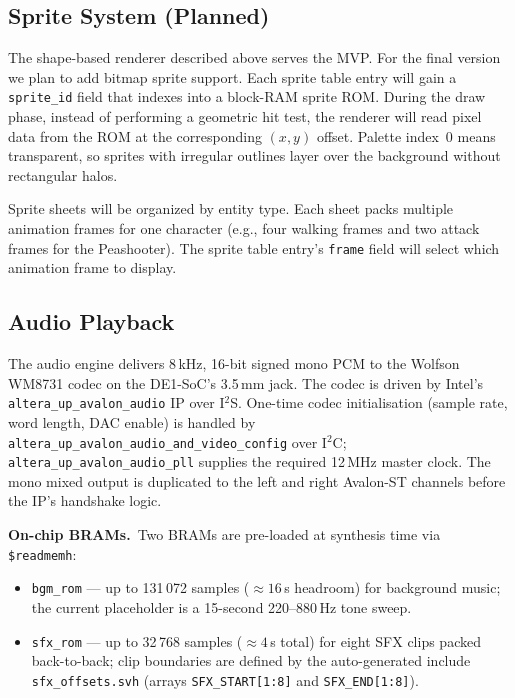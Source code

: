 \documentclass[11pt,letterpaper]{article}
\begin{document}
\subsection{Sprite System (Planned)}
\label{sec:algo-sprites}

The shape-based renderer described above serves the MVP. For the final
version we plan to add bitmap sprite support. Each sprite table entry
will gain a \texttt{sprite\_id} field that indexes into a block-RAM
sprite ROM. During the draw phase, instead of performing a geometric hit
test, the renderer will read pixel data from the ROM at the
corresponding $(x, y)$ offset. Palette index~0 means transparent, so
sprites with irregular outlines layer over the background without
rectangular halos.

Sprite sheets will be organized by entity type. Each sheet packs
multiple animation frames for one character (e.g., four walking frames
and two attack frames for the Peashooter). The sprite table entry's
\texttt{frame} field will select which animation frame to display.

\subsection{Audio Playback}
\label{sec:algo-audio}

The audio engine delivers 8\,kHz, 16-bit signed mono PCM to the Wolfson
WM8731 codec on the DE1-SoC's 3.5\,mm jack. The codec is driven by
Intel's \texttt{altera\_up\_avalon\_audio} IP over I$^2$S.
One-time codec initialisation (sample rate, word length, DAC enable) is
handled by \texttt{altera\_up\_avalon\_audio\_and\_video\_config} over
I$^2$C; \texttt{altera\_up\_avalon\_audio\_pll} supplies the required
12\,MHz master clock. The mono mixed output is duplicated to the left
and right Avalon-ST channels before the IP's handshake logic.

\textbf{On-chip BRAMs.}\ Two BRAMs are pre-loaded at synthesis time via
\texttt{\$readmemh}:
\begin{itemize}[nosep]
  \item \texttt{bgm\_rom} --- up to 131\,072 samples
    (${\approx}16$\,s headroom) for background music; the current
    placeholder is a 15-second 220--880\,Hz tone sweep.
  \item \texttt{sfx\_rom} --- up to 32\,768 samples (${\approx}4$\,s
    total) for eight SFX clips packed back-to-back; clip boundaries are
    defined by the auto-generated include \texttt{sfx\_offsets.svh}
    (arrays \texttt{SFX\_START[1:8]} and \texttt{SFX\_END[1:8]}).
\end{itemize}
\end{document}
